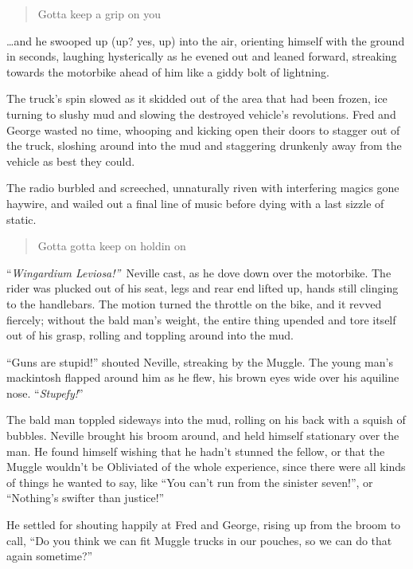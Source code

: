 \begin{quote}
\noindent {} Gotta keep a grip on you \\
\end{quote}

\ldots and he swooped up (up? yes, up) into the air, orienting himself
with the ground in seconds, laughing hysterically as he evened out and
leaned forward, streaking towards the motorbike ahead of him like a
giddy bolt of lightning.

The truck's spin slowed as it skidded out of the area that had been
frozen, ice turning to slushy mud and slowing the destroyed vehicle's
revolutions. Fred and George wasted no time, whooping and kicking open
their doors to stagger out of the truck, sloshing around into the mud
and staggering drunkenly away from the vehicle as best they could.

The radio burbled and screeched, unnaturally riven with interfering
magics gone haywire, and wailed out a final line of music before dying
with a last sizzle of static.\\

\begin{quote}
\noindent {} Gotta gotta keep on holdin on \\
\end{quote}

``\emph{Wingardium Leviosa!''}~Neville cast, as he dove down over the
motorbike. The rider was plucked out of his seat, legs and rear end
lifted up, hands still clinging to the handlebars. The motion turned the
throttle on the bike, and it revved fiercely; without the bald man's
weight, the entire thing upended and tore itself out of his grasp,
rolling and toppling around into the mud.

``Guns are stupid!'' shouted Neville, streaking by the Muggle. The young
man's mackintosh flapped around him as he flew, his brown eyes wide over
his aquiline nose. ``\emph{Stupefy!}''

The bald man toppled sideways into the mud, rolling on his back with a
squish of bubbles. Neville brought his broom around, and held himself
stationary over the man. He found himself wishing that he hadn't stunned
the fellow, or that the Muggle wouldn't be Obliviated of the whole
experience, since there were all kinds of things he wanted to say, like
``You can't run from the sinister seven!'', or ``Nothing's swifter than
justice!''

He settled for shouting happily at Fred and George, rising up from the
broom to call, ``Do you think we can fit Muggle trucks in our pouches,
so we can do that again sometime?''

